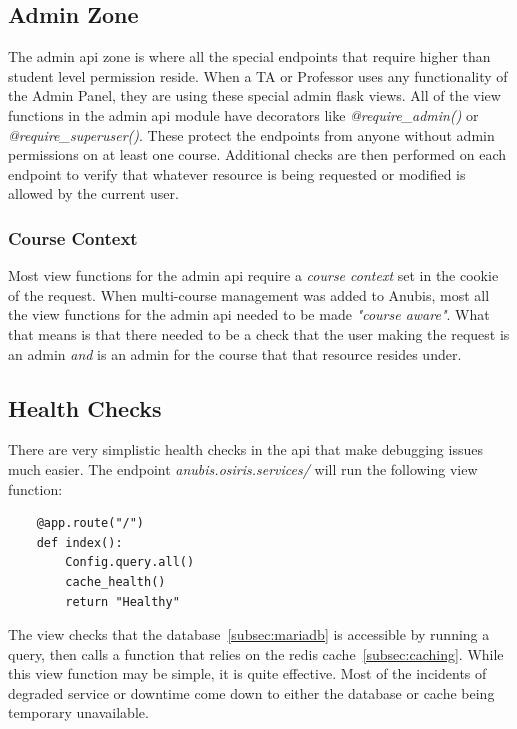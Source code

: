 \subsection{Admin Zone}\label{subsec:api-admin-zone}
The admin api zone is where all the special endpoints that require higher than student level permission reside.
When a TA or Professor uses any functionality of the Admin Panel, they are using these special
admin flask views.
All of the view functions in the admin api module have decorators like \textit{@require\_admin()} or
\textit{@require\_superuser()}.
These protect the endpoints from anyone without admin permissions on at least one course.
Additional checks are then performed on each endpoint to verify that whatever resource is being requested
or modified is allowed by the current user.

\subsubsection{Course Context}\label{subsubsec:course-context}
Most view functions for the admin api require a \textit{course context} set in the cookie of the request.
When multi-course management was added to Anubis, most all the view functions for the admin api
needed to be made \textit{"course aware"}.
What that means is that there needed to be a check that the user making the request is an admin \textit{and} is
an admin for the course that that resource resides under.

\subsection{Health Checks}\label{subsec:api-health-checks}
There are very simplistic health checks in the api that make debugging issues much easier.
The endpoint \textit{anubis.osiris.services/} will run the following view function:

\begin{verbatim}
    @app.route("/")
    def index():
        Config.query.all()
        cache_health()
        return "Healthy"
\end{verbatim}

The view checks that the database~\ref{subsec:mariadb} is accessible by running a query, then calls a function that relies on the
redis cache~\ref{subsec:caching}.
While this view function may be simple, it is quite effective.
Most of the incidents of degraded service or downtime come down to either the database or cache being temporary
unavailable.

